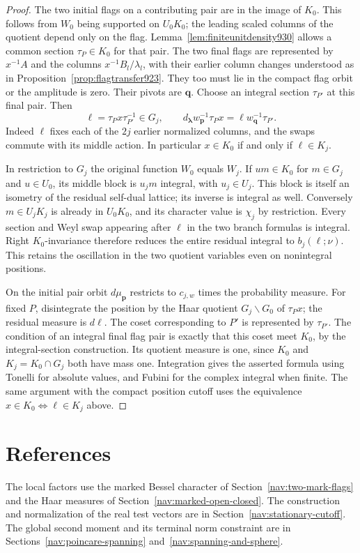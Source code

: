 \documentclass[a4paper,11pt]{article}
\theoremstyle{definition}
\theoremstyle{remark}
\numberwithin{equation}{section}
\begin{document}
\begin{proof}
The two initial flags on a contributing pair are in the image
of \(K_0\). This follows from \(W_0\) being supported on
\(U_0 K_0\); the leading scaled columns of the quotient
depend only on the flag. Lemma~\ref{lem:finiteunitdensity930}
allows a common section \(\tau_P\in K_0\) for that pair.
The two final flags are represented by \(x^{-1}A\) and the
columns \(x^{-1}B_l/\lambda_l\), with their earlier column
changes understood as in Proposition~\ref{prop:flagtransfer923}.
They too must lie in the compact flag orbit or the amplitude
is zero. Their pivots are \(\mathbf q\). Choose an integral
section \(\tau_{P'}\) at this final pair. Then
\[
       \ell=\tau_P x\tau_{P'}^{-1}\in G_j,\qquad
 d_{\boldsymbol\lambda}w_{\mathbf p}^{-1}\tau_P x
                    =\ell w_{\mathbf q}^{-1}\tau_{P'} .
\]
Indeed \(\ell\) fixes each of the \(2j\) earlier normalized
columns, and the swaps commute with its middle action.
In particular \(x\in K_0\) if and only if \(\ell\in K_j\).

In restriction to \(G_j\) the original function \(W_0\) equals
\(W_j\). If \(u m\in K_0\) for \(m\in G_j\) and \(u\in U_0\),
its middle block is \(u_jm\) integral, with \(u_j\in U_j\).
This block is itself an isometry of the residual self-dual
lattice; its inverse is integral as well. Conversely
\(m\in U_jK_j\) is already in \(U_0K_0\), and its character
value is \(\chi_j\) by restriction. Every section and Weyl swap
appearing after \(\ell\) in the two branch formulas is integral.
Right \(K_0\)-invariance therefore reduces the entire residual
integral to \(b_j(\ell;\nu)\). This retains the oscillation in
the two quotient variables even on nonintegral positions.

On the initial pair orbit \(d\mu_{\mathbf p}\) restricts to
\(c_{j,w}\) times the probability measure. For fixed \(P\),
disintegrate the position by the Haar quotient \(G_j\backslash
G_0\) of \(\tau_Px\); the residual measure is \(d\ell\).
The coset corresponding to \(P'\) is represented by
\(\tau_{P'}\). The condition of an integral final flag pair is
exactly that this coset meet \(K_0\), by the integral-section
construction. Its quotient measure is one, since \(K_0\)
and \(K_j=K_0\cap G_j\) both have mass one. Integration gives
the asserted formula using Tonelli for absolute values, and
Fubini for the complex integral when finite. The same argument
with the compact position cutoff uses the equivalence
\(x\in K_0\Longleftrightarrow\ell\in K_j\) above.
\end{proof}
\clearpage

\section{References}\label{nav:bibliography-XXVI}
The local factors use the marked Bessel character of Section~\ref{nav:two-mark-flags} and the Haar measures of Section~\ref{nav:marked-open-closed}. The construction and normalization of the real test vectors are in Section~\ref{nav:stationary-cutoff}. The global second moment and its terminal norm constraint are in Sections~\ref{nav:poincare-spanning} and~\ref{nav:spanning-and-sphere}.
\end{document}
